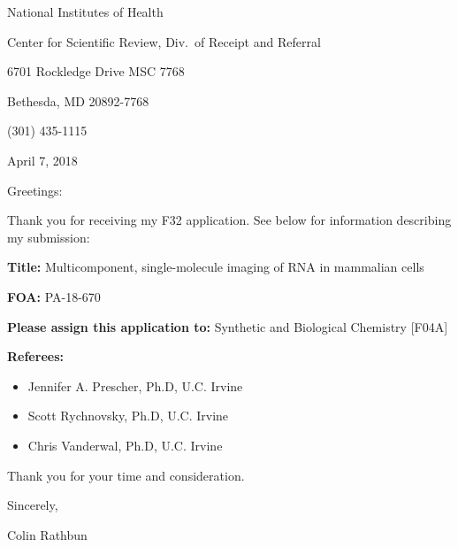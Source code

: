 
National Institutes of Health

Center for Scientific Review, Div.\ of Receipt and Referral

6701 Rockledge Drive MSC 7768

Bethesda, MD 20892-7768

(301) 435-1115

\vspace{0.5cm}
April 7, 2018

\vspace{0.5cm}
Greetings:

Thank you for receiving my F32 application. See below for information describing my submission:

\vspace{0.5cm}
\textbf{Title:} Multicomponent, single-molecule imaging of RNA in mammalian cells

\vspace{0.5cm}
\textbf{FOA:} PA-18-670

\vspace{0.5cm}
\textbf{Please assign this application to:} Synthetic and Biological Chemistry [F04A]

\vspace{0.5cm}
\textbf{Referees:}
\begin{itemize}
  \item Jennifer A. Prescher, Ph.D, U.C. Irvine
  \item Scott Rychnovsky, Ph.D, U.C. Irvine
  \item Chris Vanderwal, Ph.D, U.C. Irvine
\end{itemize}
\vspace{2cm}
Thank you for your time and consideration.

\vspace{0.5cm}
Sincerely,

\vspace{3cm}
Colin Rathbun

